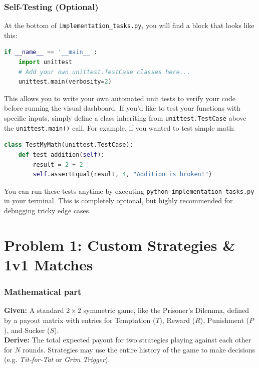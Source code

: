 \documentclass[11pt]{article}
\begin{document}
\subsubsection*{Self-Testing (Optional)}
At the bottom of \lstinline|implementation_tasks.py|, you will find a block that looks like this:
\begin{lstlisting}[language=Python]
if __name__ == '__main__':
    import unittest
    # Add your own unittest.TestCase classes here...
    unittest.main(verbosity=2)
\end{lstlisting}
This allows you to write your own automated unit tests to verify your code before running the visual dashboard. If you'd like to test your functions with specific inputs, simply define a class inheriting from \lstinline|unittest.TestCase| above the \lstinline|unittest.main()| call. For example, if you wanted to test simple math:
\begin{lstlisting}[language=Python]
class TestMyMath(unittest.TestCase):
    def test_addition(self):
        result = 2 + 2
        self.assertEqual(result, 4, "Addition is broken!")
\end{lstlisting}
You can run these tests anytime by executing \lstinline|python implementation_tasks.py| in your terminal. This is completely optional, but highly recommended for debugging tricky edge cases.
\section*{Problem 1: Custom Strategies \& 1v1 Matches}

\subsubsection*{Mathematical part}
\textbf{Given:} A standard $2 \times 2$ symmetric game, like the Prisoner's Dilemma, defined by a payout matrix with entries for Temptation ($T$), Reward ($R$), Punishment ($P$), and Sucker ($S$). \\
\textbf{Derive:} The total expected payout for two strategies playing against each other for $N$ rounds. Strategies may use the entire history of the game to make decisions (e.g. \textit{Tit-for-Tat} or \textit{Grim Trigger}).
\end{document}

